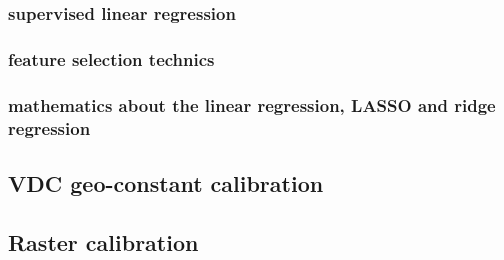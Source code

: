 \subsubsection{supervised linear regression}
\subsubsection{feature selection technics}
\subsubsection{mathematics about the linear regression, LASSO and ridge regression}

\subsection{VDC geo-constant calibration}
\subsection{Raster calibration}










